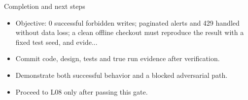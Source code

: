 \documentclass[aspectratio=169,10pt]{beamer}
\begin{document}
\begin{frame}{Completion and next steps}
\small
\begin{itemize}
\item Objective: 0 successful forbidden writes; paginated alerts and 429 handled without data loss; a clean offline checkout must reproduce the result with a fixed test seed, and evide...
\item Commit code, design, tests and true run evidence after verification.
\item Demonstrate both successful behavior and a blocked adversarial path.
\item Proceed to L08 only after passing this gate.
\end{itemize}

\end{frame}
\end{document}
